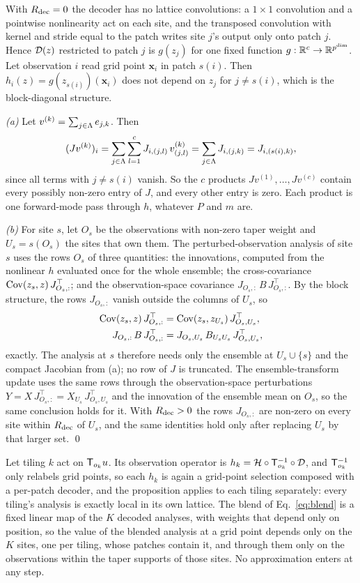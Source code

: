 With $R_{\mathrm{dec}}=0$ the decoder has no lattice convolutions: a $1\times1$
convolution and a pointwise nonlinearity act on each site, and the
transposed convolution with kernel and stride equal to the patch writes
site $j$'s output only onto patch $j$. Hence $\mathcal{D}(z)$ restricted to patch
$j$ is $g(z_j)$ for one fixed function $g:\mathbb{R}^c\to\mathbb{R}^{p^{\dim}}$. Let
observation $i$ read grid point $\bm{x}_i$ in patch $s(i)$. Then
$h_i(z)=g(z_{s(i)})(\bm{x}_i)$ does not depend on $z_j$ for $j\ne s(i)$,
which is the block-diagonal structure.

\emph{(a)} Let $v^{(k)}=\sum_{j\in\Lambda}e_{j,k}$. Then
\[
  (Jv^{(k)})_i = \sum_{j\in\Lambda}\sum_{l=1}^{c} J_{i,(j,l)}\,v^{(k)}_{(j,l)}
  = \sum_{j\in\Lambda} J_{i,(j,k)} = J_{i,(s(i),k)},
\]
since all terms with $j\ne s(i)$ vanish. So the $c$ products
$Jv^{(1)},\dots,Jv^{(c)}$ contain every possibly non-zero entry of $J$,
and every other entry is zero. Each product is one forward-mode pass
through $h$, whatever $P$ and $m$ are.

\emph{(b)} For site $s$, let $O_s$ be the observations with non-zero
taper weight and $U_s=s(O_s)$ the sites that own them. The
perturbed-observation analysis of site $s$ uses the rows $O_s$ of three
quantities: the innovations, computed from the nonlinear $h$ evaluated
once for the whole ensemble; the cross-covariance
$\operatorname{Cov}(z_s, z)\,J_{O_s,:}^{\top}$; and the observation-space covariance
$J_{O_s,:}\,B\,J_{O_s,:}^{\top}$. By the block structure, the rows
$J_{O_s,:}$ vanish outside the columns of $U_s$, so
\[
\begin{aligned}
  \operatorname{Cov}(z_s,z)\,J_{O_s,:}^{\top} &= \operatorname{Cov}(z_s,z_{U_s})\,J_{O_s,U_s}^{\top},\\
  J_{O_s,:}\,B\,J_{O_s,:}^{\top} &= J_{O_s,U_s}\,B_{U_sU_s}\,J_{O_s,U_s}^{\top},
\end{aligned}
\]
exactly. The analysis at $s$ therefore needs only the ensemble at
$U_s\cup\{s\}$ and the compact Jacobian from (a); no row of $J$ is
truncated. The ensemble-transform update uses the same rows through the
observation-space perturbations $Y = X\,J_{O_s,:}^{\top} = X_{U_s}\,J_{O_s,U_s}^{\top}$
and the innovation of the ensemble mean on $O_s$, so the same conclusion
holds for it. With $R_{\mathrm{dec}}>0$ the rows $J_{O_s,:}$ are non-zero on every site
within $R_{\mathrm{dec}}$ of $U_s$, and the same identities hold only after replacing
$U_s$ by that larger set. \qed

 Let tiling $k$ act on $\mathsf{T}_{o_k}u$. Its observation operator
is $h_k = \mathcal{H}\circ\mathsf{T}_{o_k}^{-1}\circ\mathcal{D}$, and $\mathsf{T}_{o_k}^{-1}$ only relabels grid points, so each $h_k$ is
again a grid-point selection composed with a per-patch decoder, and the proposition applies to
each tiling separately: every tiling's analysis is exactly local in its own lattice. The blend of
Eq.~\eqref{eq:blend} is a fixed linear map of the $K$ decoded analyses, with weights that depend only
on position, so the value of the blended analysis at a grid point depends only on the $K$ sites, one per
tiling, whose patches contain it, and through them only on the observations within the taper
supports of those sites. No approximation enters at any step.
